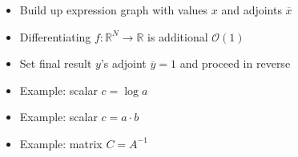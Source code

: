 \documentclass[9pt]{report}
\begin{document}
\begin{itemize}
\item Build up expression graph with values $x$ and adjoints $\overline{x}$
\item Differentiating $f:\mathbb{R}^N \rightarrow \mathbb{R}$ is additional $\mathcal{O}(1)$
\item Set final result $y$'s adjoint $\overline{y} = 1$ and proceed in reverse
\item Example:  scalar $c = \log a$
\item Example: scalar $c = a \cdot b$
\item Example: matrix $C = A^{-1}$
\begin{subitemize}
\item $\overline{A} \ {+}{=} \ -C^{\top} \cdot \overline{C} \cdot C^{\top}$
\end{subitemize}
\end{itemize}
\end{document}
